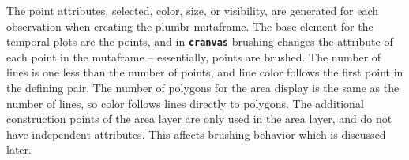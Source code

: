\documentclass[12pt]{article}
\begin{document}
The point attributes, selected, color, size, or visibility, are generated for each observation when creating the plumbr mutaframe. The base element for the temporal plots are the points, and in \texttt{\textbf{cranvas}} brushing changes the attribute of each point in the mutaframe -- essentially, points are brushed. The number of lines is one less than the number of points, and line color follows the first point in the defining pair. The number of polygons for the area display is the same as the number of lines, so color follows lines directly to polygons. The additional construction points of the area layer are only used in the area layer, and do not have independent attributes. This affects brushing behavior which is discussed later. 



\end{document}
